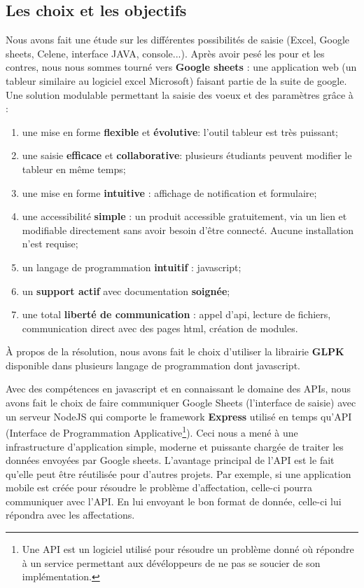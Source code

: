 \documentclass[final,poster]{polytech/polytech}
\begin{document}
\subsection{Les choix et les objectifs}
Nous avons fait une étude sur les différentes possibilités de saisie (Excel, Google sheets, Celene, interface JAVA, console...).
Après avoir pesé les pour et les contres, nous nous sommes tourné vers \textbf{Google sheets} : une application web (un tableur similaire au logiciel excel Microsoft) faisant partie de la suite de google.
Une solution modulable permettant la saisie des voeux et des paramètres grâce à :
\begin{enumerate}
\item une mise en forme \textbf{flexible} et \textbf{évolutive}: l'outil tableur est très puissant;
\item une saisie \textbf{efficace} et \textbf{collaborative}: plusieurs étudiants peuvent modifier le tableur en même temps;
\item une mise en forme \textbf{intuitive} : affichage de notification et formulaire;
\item une accessibilité \textbf{simple} : un produit accessible gratuitement, via un lien et modifiable directement sans avoir besoin d'être connecté. Aucune installation n’est requise;
\item un langage de programmation \textbf{intuitif} : javascript;
\item un \textbf{support actif} avec documentation \textbf{soignée};
\item une total \textbf{liberté de communication} : appel d’api, lecture de fichiers, communication direct avec des pages html, création de modules.
\end{enumerate}

À propos de la résolution, nous avons fait le choix d’utiliser la librairie \textbf{GLPK} disponible dans plusieurs langage de programmation dont javascript. 

Avec des compétences en javascript et en connaissant le domaine des APIs, nous avons fait le choix de faire communiquer Google Sheets (l’interface de saisie) avec un serveur NodeJS qui comporte le framework \textbf{Express} utilisé en temps qu’API (Interface de Programmation Applicative\footnote{Une API est un logiciel utilisé pour résoudre un problème donné où répondre à un service permettant aux dévéloppeurs de ne pas se soucier de son implémentation.}).
 Ceci nous a mené à une  infrastructure d’application simple, moderne et puissante chargée de traiter les données envoyées par Google sheets.
L’avantage principal de l’API est le fait qu’elle peut être réutilisée pour d’autres projets. 
Par exemple, si une application mobile est créée pour résoudre le problème d’affectation, celle-ci pourra communiquer avec l’API.
En lui envoyant le bon format de donnée, celle-ci lui répondra avec les affectations. 
\end{document}
